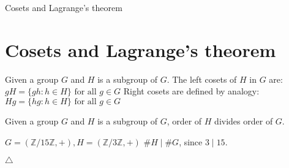 \documentclass{beamer}
\begin{document}

\begin{frame}{Cosets and Lagrange's theorem}
	\section{Cosets and Lagrange's theorem}

	\begin{definition}[Coset]
		Given a group $G$ and $H$ is a subgroup of $G$. The left cosets of $H$ in $G$ are: \newline
		$gH = \{gh : h \in H\} \text{ for all } g \in G$ \newline
		Right cosets are defined by analogy: \newline
		$Hg = \{hg : h \in H\} \text{ for all } g \in G$
	\end{definition}
	
	\begin{theorem}
		Given a group $G$ and $H$ is a subgroup of $G$, order of $H$ divides order of $G$.
	\end{theorem}
	\begin{example}
		$G = (\mathbb{Z} / 15\mathbb{Z}, +), H = (\mathbb{Z} / 3\mathbb{Z}, +)$ \newline
		$\# H \mid \# G$, since $3 \mid 15$. 
	\end{example}
	$\triangle$
\end{frame}

\end{document}
